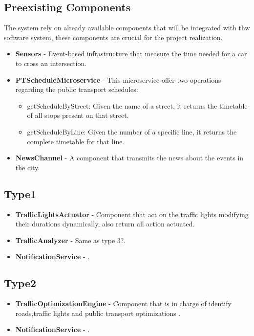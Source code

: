 \documentclass[a4paper,12pt]{article}
\begin{document}
\subsection*{Preexisting Components}
The system rely on already available components that will be integrated with thw software system, these components
are crucial for the project realization.   
\begin{itemize}
    \item \textbf{Sensors} - Event-based infrastructure that measure the time needed for a car to cross an intersection. 
    \item \textbf{PTScheduleMicroservice} - This microservice offer two operations regarding the public transport schedules:   
        \begin{itemize}
            \item getScheduleByStreet: Given the name of a street, it returns the timetable of all
            stops present on that street.
            \item getScheduleByLine: Given the number of a specific line, it returns the complete
            timetable for that line.
        \end{itemize}
    \item \textbf{NewsChannel} - A component that transmits the news about the events in the city. 
\end{itemize}

\subsection*{Type1}
\begin{itemize}
    \item \textbf{TrafficLightsActuator} - Component that act on the traffic lights modifying their durations dynamically, also return all action actuated.
    \item \textbf{TrafficAnalyzer} - Same as type 3?.
    \item \textbf{NotificationService} - .
\end{itemize}

\subsection*{Type2}
\begin{itemize}
    \item \textbf{TrafficOptimizationEngine} - Component that is in charge of identify roads,traffic lights and public transport optimizations .
    \item \textbf{NotificationService} - .
\end{itemize}
\end{document}
